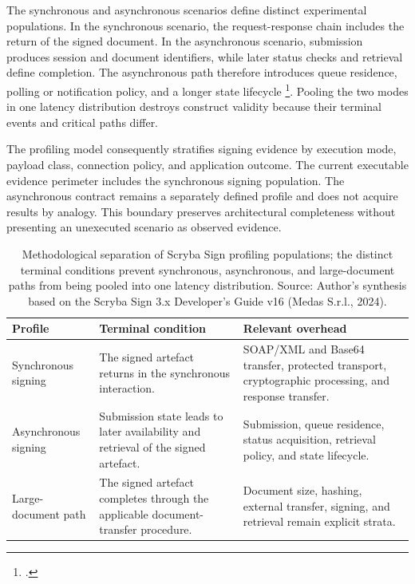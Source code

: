\noindent The synchronous and asynchronous scenarios define distinct experimental
populations. In the synchronous scenario, the request-response chain includes the
return of the signed document. In the asynchronous scenario, submission produces
session and document identifiers, while later status checks and retrieval define
completion. The asynchronous path therefore introduces queue residence, polling
or notification policy, and a longer state lifecycle
\footcite[pp.~17--18]{scryba-sign-developer-guide-v16}. Pooling the two modes in one
latency distribution destroys construct validity because their terminal events
and critical paths differ.

\noindent The profiling model consequently stratifies signing evidence by execution mode,
payload class, connection policy, and application outcome. The current executable
evidence perimeter includes the synchronous signing population. The asynchronous
contract remains a separately defined profile and does not acquire results by
analogy. This boundary preserves architectural completeness without presenting an
unexecuted scenario as observed evidence.

\begingroup
\renewcommand{\arraystretch}{1.0}
\begin{table}[H]
    \centering
    \caption[Scryba Sign profiling populations]{Methodological separation of
    Scryba Sign profiling populations;
    the distinct terminal conditions prevent synchronous, asynchronous, and
    large-document paths from being pooled into one latency distribution.
    Source: Author's synthesis based on the Scryba Sign 3.x Developer's Guide
    v16 (Medas S.r.l., 2024).}
    \label{tab:standards-design}
    \small
    \begin{tabular}{|>{\raggedright\arraybackslash}p{2.8cm}|>{\raggedright\arraybackslash}p{4.1cm}|>{\raggedright\arraybackslash}p{4.7cm}|}
    \hline
    \rowcolor{veryPeri!18}
    \textbf{Profile} & \textbf{Terminal condition} & \textbf{Relevant overhead} \\
    \hline
    \rowcolor{tableGray}
    Synchronous signing & The signed artefact returns in the synchronous interaction. & SOAP/XML and Base64 transfer, protected transport, cryptographic processing, and response transfer. \\
    \hline
    Asynchronous signing & Submission state leads to later availability and retrieval of the signed artefact. & Submission, queue residence, status acquisition, retrieval policy, and state lifecycle. \\
    \hline
    \rowcolor{tableGray}
    Large-document path & The signed artefact completes through the applicable document-transfer procedure. & Document size, hashing, external transfer, signing, and retrieval remain explicit strata. \\
    \hline
\end{tabular}
\end{table}
\endgroup

